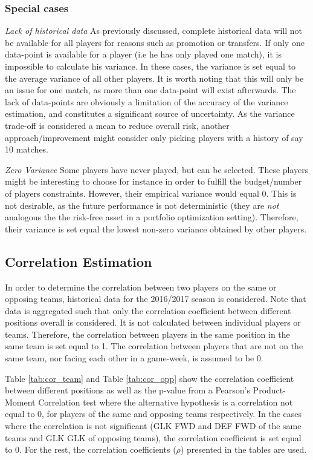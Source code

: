 \subsubsection{Special cases}
\textit{Lack of historical data}\newline
As previously discussed, complete historical data will not be available for all players for reasons such as promotion or transfers. If only one data-point is available for a player (i.e he has only played one match), it is impossible to calculate his variance. In these cases, the variance is set equal to the average variance of all other players. It is worth noting that this will only be an issue for one match, as more than one data-point will exist afterwards. The lack of data-points are obviously a limitation of the accuracy of the variance estimation, and constitutes a significant source of uncertainty. As the variance trade-off is considered a mean to reduce overall risk, another approach/improvement might consider only picking players with a history of say 10 matches. \newpar

\textit{Zero Variance}\newline
Some players have never played, but can be selected. These players might be interesting to choose for instance in order to fulfill the budget/number of players constraints. However, their empirical variance would equal 0. This is not desirable, as the future performance is not deterministic (they are \textit{not} analogous the the risk-free asset in a portfolio optimization setting). Therefore, their variance is set equal the lowest non-zero variance obtained by other players.

\subsection{Correlation Estimation}

In order to determine the correlation between two players on the same or opposing teams, historical data for the 2016/2017 season is considered. Note that data is aggregated such that only the correlation coefficient between different positions overall is considered. It is not calculated between individual players or teams. Therefore, the correlation between players in the same position in the same team is set equal to 1. The correlation between players that are not on the same team, nor facing each other in a game-week, is assumed to be 0.\newpar

Table \ref{tab:cor_team} and Table \ref{tab:cor_opp} show the correlation coefficient between different positions as well as the p-value from a Pearson's Product-Moment Correlation test where the alternative hypothesis is a correlation not equal to 0, for players of the same and opposing teams respectively. In the cases where the correlation is not significant (GLK FWD and DEF FWD of the same teams and GLK GLK of opposing teams), the correlation coefficient is set equal to 0. For the rest, the correlation coefficients ($\rho$) presented in the tables are used.

